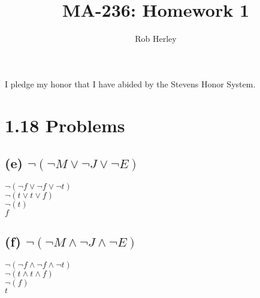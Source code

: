 \documentclass[12pt]{article}
\begin{document}
\title{MA-236: Homework 1}
\author{Rob Herley}
\maketitle

\begin{center}
I pledge my honor that I have abided by the Stevens Honor System.
\end{center}

\section*{1.18 Problems}
\subsection*{(e) $\neg(\neg M \lor \neg J \lor \neg E)$}
$\neg(\neg f \lor \neg f \lor \neg t)$ \\
$\neg(t \lor t \lor f)$ \\
$\neg(t)$ \\
$f$ \\

\subsection*{(f) $\neg(\neg M \land \neg J \land \neg E)$}
$\neg(\neg f \land \neg f \land \neg t)$ \\
$\neg(t \land t \land f)$ \\
$\neg(f)$ \\
$t$ \\
\end{document}
